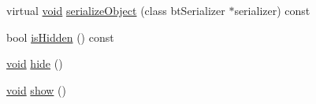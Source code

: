 \begin{DoxyCompactItemize}
\item 
virtual \mbox{\hyperlink{_thread_8h_af1e856da2e658414cb2456cb6f7ebc66}{void}} \mbox{\hyperlink{classnjli_1_1_checkbox_h_u_d_a4fc4bcd9d1930911474210c047372fc0}{serialize\+Object}} (class bt\+Serializer $\ast$serializer) const
\item 
bool \mbox{\hyperlink{classnjli_1_1_checkbox_h_u_d_a3009efb11b4bcd56bd933c21b230a125}{is\+Hidden}} () const
\item 
\mbox{\hyperlink{_thread_8h_af1e856da2e658414cb2456cb6f7ebc66}{void}} \mbox{\hyperlink{classnjli_1_1_checkbox_h_u_d_a5d7b8b3bc421084f282343e506a6d289}{hide}} ()
\item 
\mbox{\hyperlink{_thread_8h_af1e856da2e658414cb2456cb6f7ebc66}{void}} \mbox{\hyperlink{classnjli_1_1_checkbox_h_u_d_a73ffd499fceaacd59b518a541ed2133e}{show}} ()
\end{DoxyCompactItemize}
